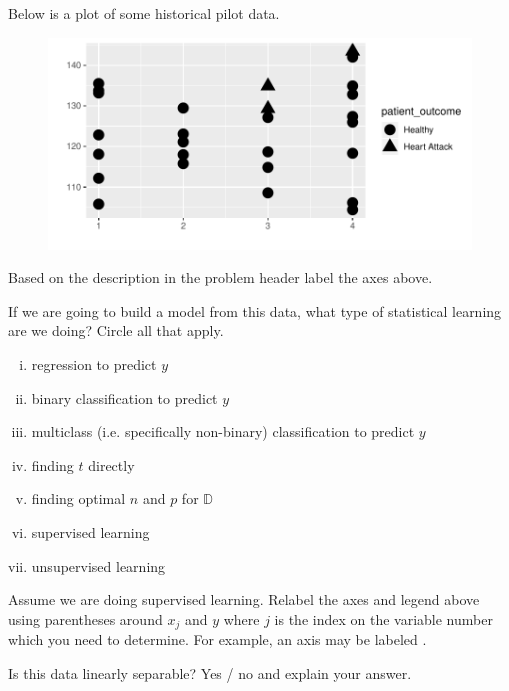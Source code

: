 \documentclass[12pt]{article}
\begin{document}
Below is a plot of some historical pilot data.

\begin{figure}[htp]
\centering
\includegraphics[width=6in]{nonlinsep}
\end{figure}

\benum
{} Based on the description in the problem header label the axes  above. 


 If we are going to build a model from this data, what type of statistical learning are we doing? Circle all that apply.

\begin{enumerate}[i)]
\item regression to predict $y$
\item binary classification to predict $y$
\item multiclass (i.e. specifically non-binary) classification to predict $y$
\item finding $t$ directly
\item finding optimal $n$ and $p$ for $\mathbb{D}$
\item supervised learning
\item unsupervised learning
\end{enumerate}

 Assume we are doing supervised learning. Relabel the axes and legend above using parentheses around $x_j$ and $y$ where $j$ is the index on the variable number which you need to determine. For example, an axis may be labeled .

 Is this data linearly separable? Yes / no and explain your answer.
\end{document}
